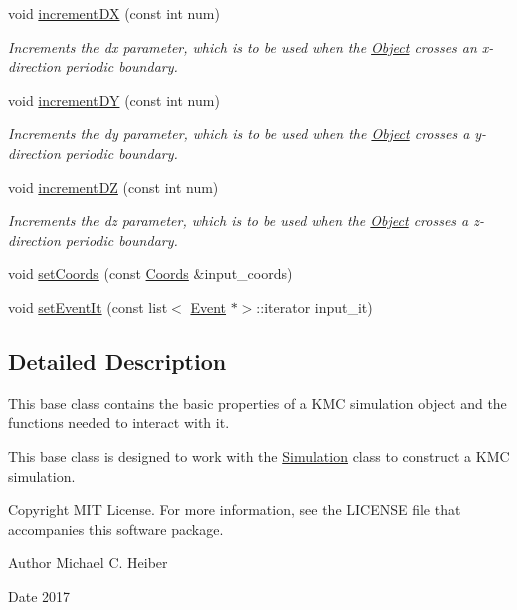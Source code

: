 \begin{DoxyCompactItemize}
void \hyperlink{class_object_a3d7c877f4aa179d9a56050c5faddc18d}{increment\+DX} (const int num)
\begin{DoxyCompactList}\small\item\em Increments the dx parameter, which is to be used when the \hyperlink{class_object}{Object} crosses an x-\/direction periodic boundary. \end{DoxyCompactList}\item 
\mbox{\label{class_object_a9df010818be72d15bad7985bf8a89ba0}} 
void \hyperlink{class_object_a9df010818be72d15bad7985bf8a89ba0}{increment\+DY} (const int num)
\begin{DoxyCompactList}\small\item\em Increments the dy parameter, which is to be used when the \hyperlink{class_object}{Object} crosses a y-\/direction periodic boundary. \end{DoxyCompactList}\item 
\mbox{\label{class_object_a440b267c478f5d63db1954bdbd543408}} 
void \hyperlink{class_object_a440b267c478f5d63db1954bdbd543408}{increment\+DZ} (const int num)
\begin{DoxyCompactList}\small\item\em Increments the dz parameter, which is to be used when the \hyperlink{class_object}{Object} crosses a z-\/direction periodic boundary. \end{DoxyCompactList}\item 
void \hyperlink{class_object_a34a164e4709e5daaba7a38c3d61ae617}{set\+Coords} (const \hyperlink{struct_coords}{Coords} \&input\+\_\+coords)
\item 
void \hyperlink{class_object_ae39c4b0bd4e6a5f07f3d0e07e32061ec}{set\+Event\+It} (const list$<$ \hyperlink{class_event}{Event} $\ast$$>$\+::iterator input\+\_\+it)
\end{DoxyCompactItemize}


\subsection{Detailed Description}
This base class contains the basic properties of a K\+MC simulation object and the functions needed to interact with it. 

This base class is designed to work with the \hyperlink{class_simulation}{Simulation} class to construct a K\+MC simulation. \begin{DoxyCopyright}{Copyright}
M\+IT License. For more information, see the L\+I\+C\+E\+N\+SE file that accompanies this software package. 
\end{DoxyCopyright}
\begin{DoxyAuthor}{Author}
Michael C. Heiber 
\end{DoxyAuthor}
\begin{DoxyDate}{Date}
2017 
\end{DoxyDate}


